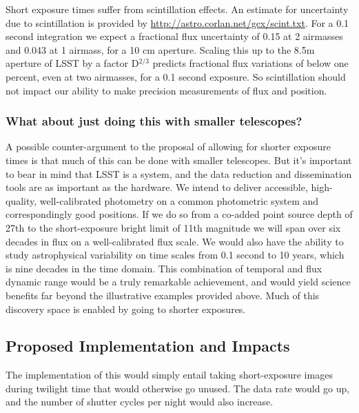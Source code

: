 Short exposure times suffer from scintillation effects. An estimate for uncertainty due to scintillation is provided by 
\url{http://astro.corlan.net/gcx/scint.txt}. For a 0.1 second integration we expect a fractional flux uncertainty of  0.15 at 2 airmasses and 0.043 at 1 airmass, for a 10 cm aperture. Scaling this up to the 8.5m aperture of LSST by a factor D$^{2/3}$ predicts fractional flux variations of below one percent, even at two airmasses, for a 0.1 second exposure. So scintillation should not impact our ability to make precision measurements of flux and position.  

\subsubsection{What about just doing this with smaller telescopes?}

A possible counter-argument to the proposal of allowing for shorter exposure times is that much of this can be done with smaller telescopes. But it's important to bear in mind that LSST is a system, and the data reduction and dissemination tools are as important as the hardware. We intend to deliver accessible, high-quality, well-calibrated photometry on a common photometric system and correspondingly good positions. If we do so from a co-added point source depth of 27th to the short-exposure bright limit of 11th magnitude we will span over six decades in flux on a well-calibrated flux scale. We would also have the ability to study astrophysical variability on time scales from 0.1 second to 10 years, which is nine decades in the time domain. This combination of temporal and flux dynamic range would be a truly remarkable  achievement, and would yield science benefits far beyond the illustrative examples provided above. Much of this discovery space is enabled by going to shorter exposures. 
 
\subsection{Proposed Implementation and Impacts}

The implementation of this would simply entail taking short-exposure images during twilight time that would otherwise go unused. The data rate would go up, and the number of shutter cycles per night would also increase. 
%
%


